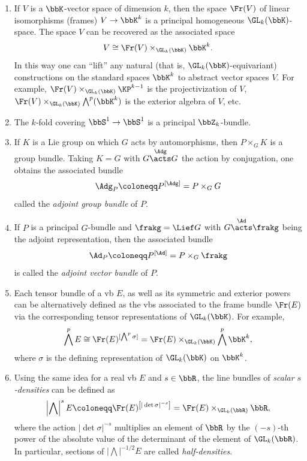 \begin{example}\label{ex associated bundles}
    \begin{enumerate}
        \item If $V$ is a $\bbK$-vector space of dimension $k$, then the space $\Fr(V)$ of linear isomorphisms (frames) $V\to \bbK^k$ is a principal homogeneous $\GL_k(\bbK)$-space. The space $V$ can be recovered as the associated space
        \[V\cong \Fr(V)\times_{\GL_k(\bbK)} \bbK^k.\]
        In this way one can ``lift'' any natural (that is, $\GL_k(\bbK)$-equivariant) constructions on the standard spaces $\bbK^k$ to abstract vector spaces $V$. For example, $\Fr(V)\times_{\GL_k(\bbK)} \KP^{k-1}$ is the projectivization of $V$, $\Fr(V)\times_{\GL_k(\bbK)}\bigwedge^p(\bbK^k)$ is the exterior algebra of $V$, etc.
        
        \item The $k$-fold covering $\bbS^1\to \bbS^1$ is a principal $\bbZ_k$-bundle.
        
        \item If $K$ is a Lie group on which $G$ acts by automorphisms, then $P\times_G K$ is a group bundle. Taking $K=G$ with $G\overset{\Adg}{\acts}G$ the action by conjugation, one obtains the associated bundle \[\Adg_P\coloneqq P^{[\Adg]}=P\times_G G\]
        called the \emph{adjoint group bundle} of $P$.

        \item If $P$ is a principal $G$-bundle and $\frakg=\Lief G$ with $G\overset{\Ad}{\acts}\frakg$ being the adjoint representation, then the associated bundle \[\Ad_P\coloneqq P^{[\Ad]}=P\times_G \frakg\] is called the \emph{adjoint vector bundle} of $P$.
       
        \item Each tensor bundle of a \gls{vb} $E$, as well as its symmetric and exterior powers can be alternatively defined as the \glspl{vb} associated to the frame bundle $\Fr(E)$ via the corresponding tensor representations of $\GL_k(\bbK)$. For example, \[\bigwedge^p E\cong \Fr(E)^{[\bigwedge^p \sigma]}=\Fr(E)\times_{\GL_k(\bbK)} \bigwedge^p \bbK^k,\]
        where $\sigma$ is the defining representation of $\GL_k(\bbK)$ on $\bbK^k$. 
        
        \item Using the same idea for a real \gls{vb} $E$ and $s\in\bbR$, the line bundles of \emph{scalar $s$-densities} can be defined as
        \[\left|\bigwedge\right|^s E\coloneqq \Fr(E)^{\left[|\det \sigma|^{-s}\right]}=\Fr(E)\times_{\GL_k(\bbR)}\bbR,\]
        where the action $|\det \sigma|^{-s}$ multiplies an element of $\bbR$ by the $(-s)$-th power of the absolute value of the determinant of the element of $\GL_k(\bbR)$. In particular, sections of $\left|\bigwedge\right|^{-1/2}E$ are called \emph{half-densities}.
        

\end{enumerate}
\end{example}
